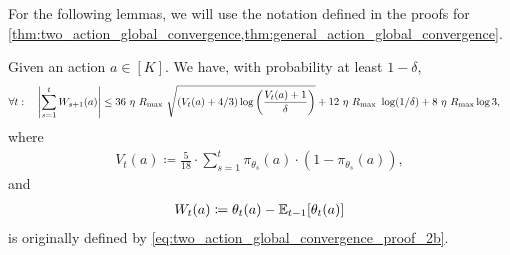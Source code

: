For the following lemmas, we will use the notation defined in the proofs for \cref{thm:two_action_global_convergence,thm:general_action_global_convergence}.

\begin{lemma}
\label{lem:parameter_noise_concentration}
Given an action $a \in [K]$. We have, with probability at least $1 - \delta$,
\begin{align}
\label{eq:parameter_noise_concentration_claim_1}
\MoveEqLeft
    \forall t:\quad \left| \sum_{s=1}^t W_{s+1}(a) \right| \le  36 \ \eta \ R_{\max} \ \sqrt{  (V_t(a)+4/3)\log \left( \frac{  V_t(a)+1  }{ \delta } \right) } + 12 \ \eta \ R_{\max} \ \log(1/\delta) +  8 \ \eta \ R_{\max}\log 3,
\end{align}
where
\begin{align}
\label{eq:parameter_noise_concentration_claim_2}
    V_t(a) \coloneqq \frac{5}{18} \cdot \sum_{s=1}^t  \pi_{\theta_s}(a)\cdot (1-\pi_{\theta_s}(a)),
\end{align}
and 
\begin{align}
\label{eq:parameter_noise_concentration_claim_3}
    W_t(a) \coloneqq \theta_t(a) - \mathbb{E}_{t-1}{[ \theta_t(a)]}
\end{align}
is originally defined by \cref{eq:two_action_global_convergence_proof_2b}.
\end{lemma}
